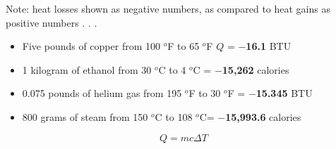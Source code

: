 \vskip 10pt

Note: heat losses shown as negative numbers, as compared to heat gains as positive numbers . . .

\begin{itemize}
\item{} Five pounds of copper from 100 $^{o}$F to 65 $^{o}$F \hskip 10pt $Q$ = {\bf $-$16.1} BTU
\vskip 10pt
\item{} 1 kilogram of ethanol from 30 $^{o}$C to 4 $^{o}$C = {\bf $-$15,262} calories  
\vskip 10pt
\item{} 0.075 pounds of helium gas from 195 $^{o}$F to 30 $^{o}$F = {\bf $-$15.345} BTU
\vskip 10pt
\item{} 800 grams of steam from 150 $^{o}$C to 108 $^{o}$C= {\bf $-$15,993.6} calories 
\end{itemize}








$$Q = mc \Delta T$$




